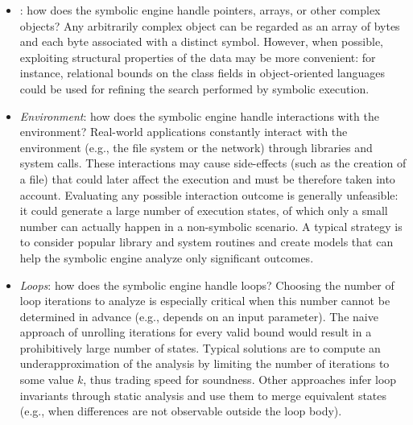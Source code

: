 \begin{itemize}

\item {}: how does the symbolic engine handle pointers, arrays, or other complex objects? Any arbitrarily complex object can be regarded as an array of bytes and each byte associated with a distinct symbol. However, when possible, exploiting structural properties of the data may be more convenient: for instance, relational bounds on the class fields in object-oriented languages could be used for refining the search performed by symbolic execution.
\vspace{1mm}

  \item {\em Environment}: how does the symbolic engine handle interactions with the environment?
  Real-world applications constantly interact with the environment (e.g., the file system or the network) through libraries and system calls. These interactions may cause side-effects
(such as the creation of a file) that could later affect the execution and must be therefore taken into account. Evaluating any possible interaction outcome is generally unfeasible: it could generate a large number of execution states, of which only a small number can actually happen in a non-symbolic scenario. A typical strategy is to consider popular library and system routines and create models that can help the symbolic engine analyze only significant outcomes.
\vspace{1mm}

  \item {\em Loops}: how does the symbolic engine handle loops?
Choosing the number of loop iterations to analyze is especially critical when this number cannot be determined in advance (e.g., depends on an input parameter). The naive approach of unrolling iterations for every valid bound would result in a prohibitively large number of states. Typical solutions are to compute an underapproximation of the analysis by limiting the number of iterations to some value $k$, thus trading speed for soundness.  Other approaches infer loop invariants through static analysis  and use them to merge equivalent states (e.g., when differences are not observable outside the loop body).
\vspace{1mm}


\end{itemize}

